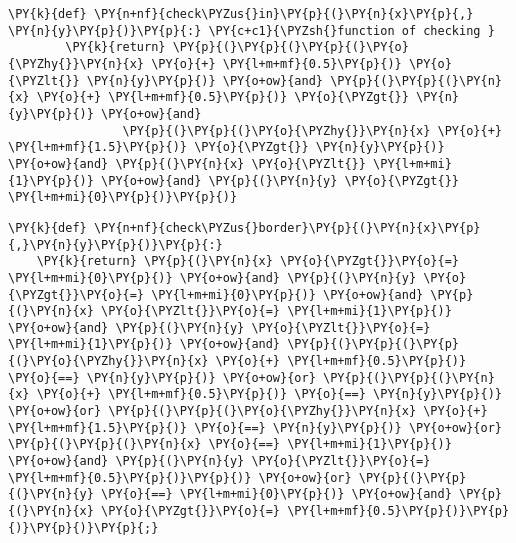    \begin{tcolorbox}[breakable, size=fbox, boxrule=1pt, pad at break*=1mm,colback=cellbackground, colframe=cellborder]
\begin{Verbatim}[commandchars=\\\{\}]
\PY{k}{def} \PY{n+nf}{check\PYZus{}in}\PY{p}{(}\PY{n}{x}\PY{p}{,} \PY{n}{y}\PY{p}{)}\PY{p}{:} \PY{c+c1}{\PYZsh{}function of checking }
        \PY{k}{return} \PY{p}{(}\PY{p}{(}\PY{p}{(}\PY{o}{\PYZhy{}}\PY{n}{x} \PY{o}{+} \PY{l+m+mf}{0.5}\PY{p}{)} \PY{o}{\PYZlt{}} \PY{n}{y}\PY{p}{)} \PY{o+ow}{and} \PY{p}{(}\PY{p}{(}\PY{n}{x} \PY{o}{+} \PY{l+m+mf}{0.5}\PY{p}{)} \PY{o}{\PYZgt{}} \PY{n}{y}\PY{p}{)} \PY{o+ow}{and}
                \PY{p}{(}\PY{p}{(}\PY{o}{\PYZhy{}}\PY{n}{x} \PY{o}{+} \PY{l+m+mf}{1.5}\PY{p}{)} \PY{o}{\PYZgt{}} \PY{n}{y}\PY{p}{)} \PY{o+ow}{and} \PY{p}{(}\PY{n}{x} \PY{o}{\PYZlt{}} \PY{l+m+mi}{1}\PY{p}{)} \PY{o+ow}{and} \PY{p}{(}\PY{n}{y} \PY{o}{\PYZgt{}} \PY{l+m+mi}{0}\PY{p}{)}\PY{p}{)}
\end{Verbatim}
\end{tcolorbox}

    \begin{tcolorbox}[breakable, size=fbox, boxrule=1pt, pad at break*=1mm,colback=cellbackground, colframe=cellborder]
\begin{Verbatim}[commandchars=\\\{\}]
\PY{k}{def} \PY{n+nf}{check\PYZus{}border}\PY{p}{(}\PY{n}{x}\PY{p}{,}\PY{n}{y}\PY{p}{)}\PY{p}{:}
    \PY{k}{return} \PY{p}{(}\PY{n}{x} \PY{o}{\PYZgt{}}\PY{o}{=} \PY{l+m+mi}{0}\PY{p}{)} \PY{o+ow}{and} \PY{p}{(}\PY{n}{y} \PY{o}{\PYZgt{}}\PY{o}{=} \PY{l+m+mi}{0}\PY{p}{)} \PY{o+ow}{and} \PY{p}{(}\PY{n}{x} \PY{o}{\PYZlt{}}\PY{o}{=} \PY{l+m+mi}{1}\PY{p}{)} \PY{o+ow}{and} \PY{p}{(}\PY{n}{y} \PY{o}{\PYZlt{}}\PY{o}{=} \PY{l+m+mi}{1}\PY{p}{)} \PY{o+ow}{and} \PY{p}{(}\PY{p}{(}\PY{p}{(}\PY{o}{\PYZhy{}}\PY{n}{x} \PY{o}{+} \PY{l+m+mf}{0.5}\PY{p}{)} \PY{o}{==} \PY{n}{y}\PY{p}{)} \PY{o+ow}{or} \PY{p}{(}\PY{p}{(}\PY{n}{x} \PY{o}{+} \PY{l+m+mf}{0.5}\PY{p}{)} \PY{o}{==} \PY{n}{y}\PY{p}{)} \PY{o+ow}{or} \PY{p}{(}\PY{p}{(}\PY{o}{\PYZhy{}}\PY{n}{x} \PY{o}{+} \PY{l+m+mf}{1.5}\PY{p}{)} \PY{o}{==} \PY{n}{y}\PY{p}{)} \PY{o+ow}{or} \PY{p}{(}\PY{p}{(}\PY{n}{x} \PY{o}{==} \PY{l+m+mi}{1}\PY{p}{)} \PY{o+ow}{and} \PY{p}{(}\PY{n}{y} \PY{o}{\PYZlt{}}\PY{o}{=} \PY{l+m+mf}{0.5}\PY{p}{)}\PY{p}{)} \PY{o+ow}{or} \PY{p}{(}\PY{p}{(}\PY{n}{y} \PY{o}{==} \PY{l+m+mi}{0}\PY{p}{)} \PY{o+ow}{and} \PY{p}{(}\PY{n}{x} \PY{o}{\PYZgt{}}\PY{o}{=} \PY{l+m+mf}{0.5}\PY{p}{)}\PY{p}{)}\PY{p}{)}\PY{p}{;}
\end{Verbatim}
\end{tcolorbox}

